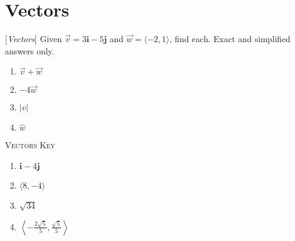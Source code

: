 \chapter{Vectors}

[\textit{Vectors}] Given $\vec{v} = 3\mathbf{i} - 5\mathbf{j}$ and $\vec{w} = \langle -2, 1 \rangle$, find each. Exact and simplified answers only.
\begin{multicols}{4}
\begin{enumerate}  
    \item $\vec{v} + \vec{w}$
    \item $-4\vec{w}$
    \item $|v|$
    \item $\hat{w}$
\end{enumerate} \setcounter{Review}{\value{enumi}}
\end{multicols}

\newpage

\textsc{Vectors Key}

\begin{enumerate}
	\item $\mathbf{i}-4\mathbf{j}$
    \item $\langle 8, -4 \rangle$
    \item $\sqrt{34}$
    \item $\left\langle -\frac{2\sqrt{5}}{5}, \frac{\sqrt{5}}{5}\right\rangle$
\end{enumerate}